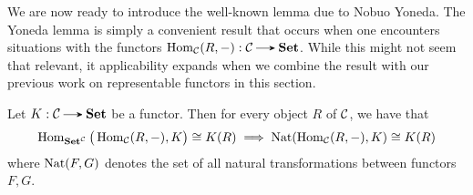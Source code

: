     We are now ready to introduce the well-known lemma due to Nobuo Yoneda.
    The Yoneda lemma is simply a convenient result that occurs when one encounters 
    situations with the functors $\hom_{\cc}(R, -): \cc \to \textbf{Set}$. While this 
    might not seem that relevant, it applicability expands when we combine the result with our 
    previous work on representable functors in this section.
     
    \begin{thm}
        Let $K: \cc \to \textbf{Set}$ be a functor. Then for every
        object $R$ of $\mathcal{C}$, we have that 
        \[
            \operatorname{\mathrm{Hom}}_{\textbf{Set}^{\mathcal{C}}}\big(\operatorname{\mathrm{Hom}}_{\mathcal{C}}(R, -), K \big)
            \cong K(R)
            \implies
            \operatorname{\mathrm{Nat}}(\operatorname{\mathrm{Hom}}_{\mathcal{C}}(R, -), K) \cong K(R)
        \]
        where $\operatorname{\mathrm{Nat}}(F, G)$ denotes the set of all natural
        transformations between functors $F, G$.
    \end{thm}

